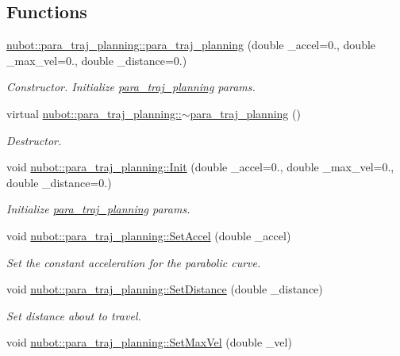 \subsection*{Functions}
\begin{DoxyCompactItemize}
\item 
\hyperlink{group__nubot_ga1300969c1d26ae23945d2ac1bc428a96}{nubot\-::para\-\_\-traj\-\_\-planning\-::para\-\_\-traj\-\_\-planning} (double \-\_\-accel=0., double \-\_\-max\-\_\-vel=0., double \-\_\-distance=0.)
\begin{DoxyCompactList}\small\item\em Constructor. Initialize \hyperlink{classnubot_1_1para__traj__planning}{para\-\_\-traj\-\_\-planning} params. \end{DoxyCompactList}\item 
virtual \hyperlink{group__nubot_gac091cb7cbef52a262db8952f52dc717d}{nubot\-::para\-\_\-traj\-\_\-planning\-::$\sim$para\-\_\-traj\-\_\-planning} ()
\begin{DoxyCompactList}\small\item\em Destructor. \end{DoxyCompactList}\item 
void \hyperlink{group__nubot_ga18420bf66ac499e432718b9c6faab5b2}{nubot\-::para\-\_\-traj\-\_\-planning\-::\-Init} (double \-\_\-accel=0., double \-\_\-max\-\_\-vel=0., double \-\_\-distance=0.)
\begin{DoxyCompactList}\small\item\em Initialize \hyperlink{classnubot_1_1para__traj__planning}{para\-\_\-traj\-\_\-planning} params. \end{DoxyCompactList}\item 
void \hyperlink{group__nubot_gacacb310a853b8045c860fd4735610b70}{nubot\-::para\-\_\-traj\-\_\-planning\-::\-Set\-Accel} (double \-\_\-accel)
\begin{DoxyCompactList}\small\item\em Set the constant acceleration for the parabolic curve. \end{DoxyCompactList}\item 
void \hyperlink{group__nubot_ga52da7443d436abac47ea0a84fb734032}{nubot\-::para\-\_\-traj\-\_\-planning\-::\-Set\-Distance} (double \-\_\-distance)
\begin{DoxyCompactList}\small\item\em Set distance about to travel. \end{DoxyCompactList}\item 
void \hyperlink{group__nubot_gae85df349fd73029b13b60ca13a60c37d}{nubot\-::para\-\_\-traj\-\_\-planning\-::\-Set\-Max\-Vel} (double \-\_\-vel)

\end{DoxyCompactItemize}
